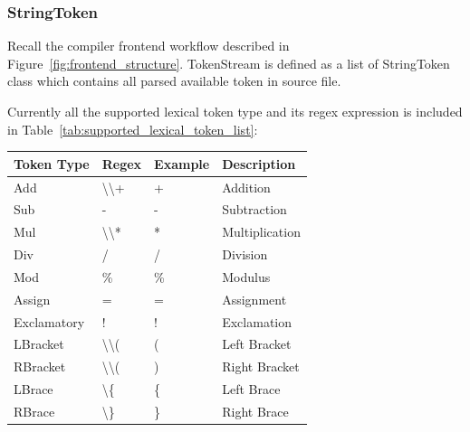 \documentclass{article}
\begin{document}
	\subsubsection{StringToken }
	Recall the compiler frontend workflow described in Figure~\ref{fig:frontend_structure}. TokenStream is defined as
	a list of StringToken class which contains all parsed available token in source file.\par
	Currently all the supported lexical token type and its regex expression is included in Table~\ref{tab:supported_lexical_token_list}: \par
	\begin{table}[hb!]
		\centering
		\begin{tabular}{l|lll}
			\hline
			Token Type   & Regex                                                  & Example           & Description    \\ \hline
			Add          & \textbackslash{}\textbackslash{}+                      & +                 & Addition       \\
			Sub          & -                                                      & -                 & Subtraction    \\
			Mul          & \textbackslash{}\textbackslash{}*                      & *                 & Multiplication \\
			Div          & /                                                      & /                 & Division       \\
			Mod          & \%                                                     & \%                & Modulus        \\
			Assign       & =                                                      & =                 & Assignment     \\
			Exclamatory  & !                                                      & !                 & Exclamation    \\
			LBracket     & \textbackslash{}\textbackslash{}(                      & (                 & Left Bracket   \\
			RBracket     & \textbackslash{}\textbackslash{}(                      & )                 & Right Bracket  \\
			LBrace       & \textbackslash{}\{                                     & \{                & Left Brace     \\
			RBrace       & \textbackslash{}\}                                     & \}                & Right Brace    \\

\end{tabular}
\end{table}
\end{document}
